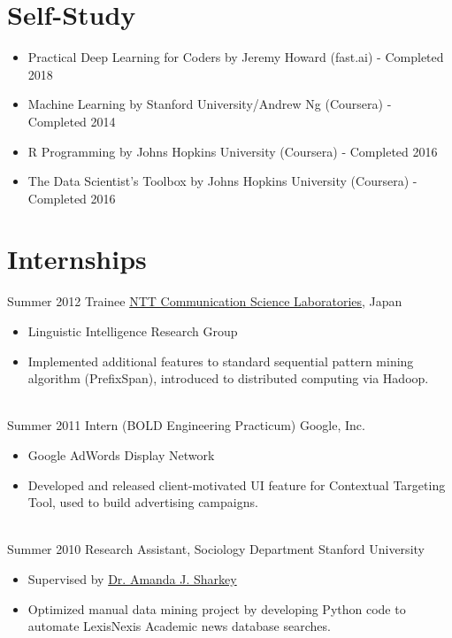 \documentclass[letterpaper]{twentysecondcv} %
\begin{document}
\section{Self-Study}
\begin{itemize} \itemsep -2pt %
        \item Practical Deep Learning for Coders by Jeremy Howard (fast.ai) - Completed 2018
        \item Machine Learning by Stanford University/Andrew Ng (Coursera) - Completed 2014
       	\item R Programming by Johns Hopkins University (Coursera) - Completed 2016
        \item The Data Scientist's Toolbox by Johns Hopkins University (Coursera) - Completed 2016
\end{itemize}


\section{Internships}
\begin{twenty}
	\twentyitem
    	{Summer}
        {2012}
        {Trainee}
        {\href{http://www.kecl.ntt.co.jp/rps/index.html}{NTT Communication Science Laboratories}, Japan}
        {}
        {\begin{itemize} \itemsep -2pt %
        \item Linguistic Intelligence Research Group
       	\item Implemented additional features to standard sequential pattern mining algorithm (PrefixSpan), introduced to distributed computing via Hadoop.
        \end{itemize}}
    \\
    \twentyitem
    	{Summer}
        {2011}
        {Intern (BOLD Engineering Practicum)}
        {Google, Inc.}
        {}
        {\begin{itemize}  \itemsep -2pt %
        \item Google AdWords Display Network
        \item Developed and released client-motivated UI feature for Contextual Targeting Tool,
            used to build advertising campaigns.
        \end{itemize}}
    \\
    \twentyitem
    	{Summer}
        {2010}
        {Research Assistant, Sociology Department}
        {Stanford University}
        {}
        {\begin{itemize}  \itemsep -2pt %
        \item Supervised by \href{https://www.chicagobooth.edu/faculty/directory/s/amanda-j-sharkey}{Dr. Amanda J. Sharkey}
        \item Optimized manual data mining project by developing Python code to automate
            LexisNexis Academic news database searches.
        \end{itemize} }
\end{twenty}
\end{document}
